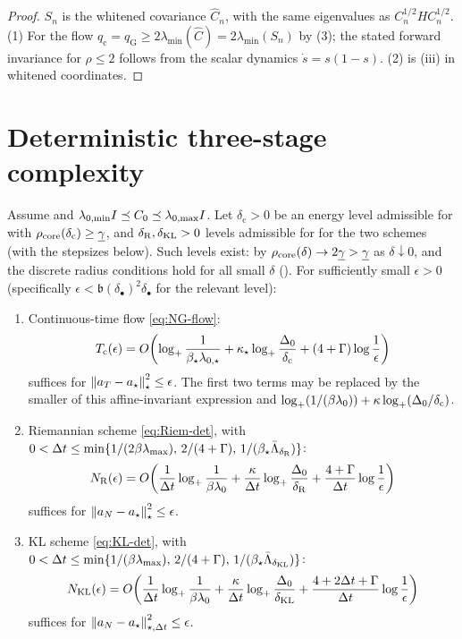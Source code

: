 \begin{proof}
$S_n$ is the whitened covariance $\widehat C_n$, with the same eigenvalues as
$C_n^{1/2}HC_n^{1/2}$. (1) For the flow $q_{\mathrm c}=q_{\mathrm G}\geq2\lambda_{\min}(\widehat C)=2\lambda_{\min}(S_n)$
by (3); the stated forward invariance for $\rho\leq2$ follows from the
scalar dynamics $\dot s=s(1-s)$. (2) is (iii) in whitened coordinates.
\end{proof}
\section{Deterministic three-stage complexity}
\label{sec:three-stage}

\begin{theorem}
\label{thm:det-three-stage}
Assume  and
$\lambda_{0,\min}I\preceq C_0\preceq\lambda_{0,\max}I$. Let $\delta_{\mathrm c}>0$ be an
energy level admissible for  with $\rho_{\mathrm{core}}(\delta_{\mathrm c})\geq\underline{\gamma}$,
and $\delta_{\mathrm{R}},\delta_{\mathrm{KL}}>0$ levels admissible for  for the two
schemes (with the stepsizes below). Such levels exist: by 
$\rho_{\mathrm{core}}(\delta)\to2\underline{\gamma}>\underline{\gamma}$ as $\delta\downarrow0$, and the discrete radius
conditions hold for all small $\delta$ (). For sufficiently small
$\epsilon>0$ (specifically $\epsilon<\mathfrak b(\delta_\bullet)^2\delta_\bullet$ for the
relevant level):
\begin{enumerate}
\item Continuous-time flow \eqref{eq:NG-flow}:
\[
    T_{\mathrm c}(\epsilon)
    =
    O\!\left(
        \log_+\frac1{\beta_\star\lambda_{0,\star}}
        +\kappa_\star\log_+\frac{\Delta_0}{\delta_{\mathrm c}}
        +(4+\Gamma)\log\frac1\epsilon
    \right)
\]
suffices for $\left\lVert a_T-a_\star\right\rVert_\star^2\leq\epsilon$.  The first two terms may be replaced by
the smaller of this affine-invariant expression and
$\log_+(1/(\beta\lambda_0))+\kappa\log_+(\Delta_0/\delta_{\mathrm c})$.
\item Riemannian scheme \eqref{eq:Riem-det}, with
$0<\Delta t\leq\min\{1/(2\beta\lambda_{\max}),\,2/(4+\Gamma),\,1/(\beta_\star\bar\Lambda_{\delta_{\mathrm{R}}})\}$:
\[
    N_{\mathrm{R}}(\epsilon)
    =
    O\!\left(
        \frac1{\Delta t}\log_+\frac1{\beta\lambda_0}
        +
        \frac\kappa{\Delta t}\log_+\frac{\Delta_0}{\delta_{\mathrm{R}}}
        +
        \frac{4+\Gamma}{\Delta t}\log\frac1\epsilon
    \right)
\]
suffices for $\left\lVert a_N-a_\star\right\rVert_\star^2\leq\epsilon$.
\item KL scheme \eqref{eq:KL-det}, with
$0<\Delta t\leq\min\{1/(\beta\lambda_{\max}),\,2/(4+\Gamma),\,1/(\beta_\star\bar\Lambda_{\delta_{\mathrm{KL}}})\}$:
\[
    N_{\mathrm{KL}}(\epsilon)
    =
    O\!\left(
        \frac1{\Delta t}\log_+\frac1{\beta\lambda_0}
        +
        \frac\kappa{\Delta t}\log_+\frac{\Delta_0}{\delta_{\mathrm{KL}}}
        +
        \frac{4+2\Delta t+\Gamma}{\Delta t}\log\frac1\epsilon
    \right)
\]
suffices for $\left\lVert a_N-a_\star\right\rVert_{\star,\Delta t}^2\leq\epsilon$.
\end{enumerate}
\end{theorem}

